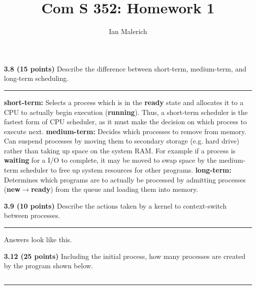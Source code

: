\documentclass[12pt]{jhwhw}
\author{Ian Malerich}
\title{Com S 352: Homework 1}
\begin{document}
\raggedright

\textbf{3.8 (15 points)} Describe the difference between short-term, medium-term, and 
	long-term scheduling.
\textcolor[RGB]{240,240,240}{\rule{\textwidth}{0.5pt}}\bigbreak

	\begin{addmargin}[1em]{}
		\textbf{short-term:} Selects a process which is in the \textbf{ready} state 
			and allocates it to a CPU to actually begin execution (\textbf{running}). 
			Thus, a short-term scheduler is the fastest form of CPU scheduler, 
			as it must make the decision on which process to execute next.
		\bigbreak
		\textbf{medium-term:} Decides which processes to remove from memory.
			Can suspend processes by moving them to secondary storage (e.g. 
			hard drive) rather than taking up space on the system RAM.
			For example if a process is \textbf{waiting} for a I/O to complete,
			it may be moved to swap space by the medium-term scheduler to free
			up system resources for other programs.
		\bigbreak
		\textbf{long-term:} Determines which programs are to actually be processed
			by admitting processes (\textbf{new}$\rightarrow$\textbf{ready})
			from the queue and loading them into memory.
	\end{addmargin}

\bigbreak
\textbf{3.9 (10 points)} Describe the actions taken by a kernel to context-switch
	between processes.
\textcolor[RGB]{240,240,240}{\rule{\textwidth}{0.5pt}}\bigbreak

	\begin{addmargin}[1em]{}
		Answers look like this.
	\end{addmargin}

\bigbreak
\textbf{3.12 (25 points)} Including the initial process, how many processes are created by 
	the program shown below.
\inputminted{c}{3.12.c}
\textcolor[RGB]{240,240,240}{\rule{\textwidth}{0.5pt}}\bigbreak
\end{document}
